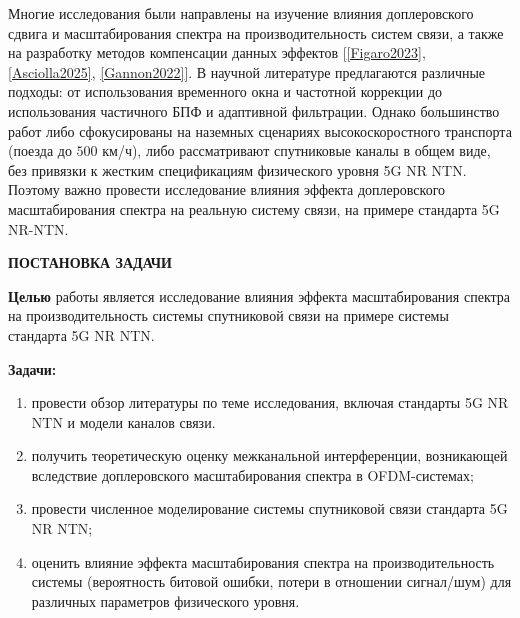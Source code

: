 Многие исследования были направлены на изучение влияния доплеровского сдвига и масштабирования спектра
на производительность систем связи, а также на разработку методов компенсации данных эффектов [\ref{Figaro2023}, \ref{Asciolla2025}, \ref{Gannon2022}].
В научной литературе предлагаются различные подходы: от использования временного окна
и частотной коррекции до использования частичного БПФ и адаптивной фильтрации.
Однако большинство работ либо сфокусированы на наземных сценариях высокоскоростного транспорта (поезда до $500$ км/ч),
либо рассматривают спутниковые каналы в общем виде, без привязки к жестким спецификациям
физического уровня 5G NR NTN. Поэтому важно провести исследование влияния эффекта доплеровского
масштабирования спектра на реальную систему связи, на примере стандарта 5G NR-NTN.

\newpage
\begin{center}
  \textbf{\large ПОСТАНОВКА ЗАДАЧИ}
\end{center}

\textbf{Целью} работы является исследование влияния эффекта масштабиро\-вания спектра на 
производительность системы спутниковой связи на примере системы стандарта 5G NR NTN.

\textbf{Задачи:}
\begin{enumerate}
    \item провести обзор литературы по теме исследования, включая стандарты 5G NR NTN
          и модели каналов связи.
    \item получить теоретическую оценку межканальной интерференции, возникающей вследствие доплеровского масштабирования спектра в OFDM-системах;
    \item провести численное моделирование системы спутниковой связи стандарта 5G NR NTN;
    \item оценить влияние эффекта масштабирования спектра на производитель\-ность системы (вероятность битовой ошибки, потери в отношении сигнал/шум) для различных параметров физического уровня.
\end{enumerate}

